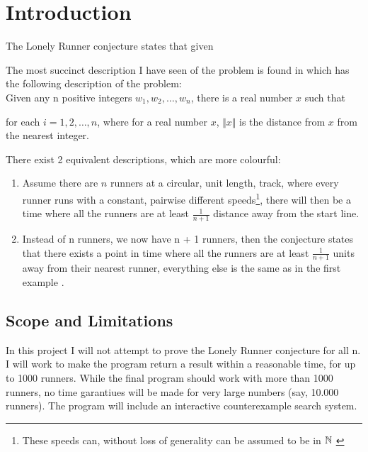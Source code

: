 \section{Introduction}
\label{introduction}

The Lonely Runner conjecture states that given 

The most succinct description I have seen of the problem is found in \cite{ANote} which has the following description of the problem:\\

Given any n positive integers $w_1, w_2, \ldots, w_n$, there is a real number $x$ such that 

for each $i = 1, 2, \ldots, n$, where for a real number $x$, $\Vert x \Vert$ is the distance from $x$ from the nearest integer.

There exist 2 equivalent descriptions, which are more colourful:
\begin{enumerate}
\item Assume there are $n$ runners at a circular, unit length, track, where every runner runs with a constant,  pairwise different speeds\footnote{These speeds can, without loss of generality can be assumed to be in $\mathbb{N}$ \cite{Bienia97flows.view-obstructions}}, there will then be a time where all the runners are at least $\frac{1}{n + 1}$ distance away from the start line.\\

\item Instead of n runners, we now have n + 1 runners, then the conjecture states that there exists a point in time where all the runners are at least $\frac{1}{n + 1}$ units away from their nearest runner, everything else is the same as in the first example \cite{Bienia97flows.view-obstructions}.\\
\end{enumerate}

\subsection{Scope and Limitations}
\label{scope}
In this project I will not attempt to prove the Lonely Runner conjecture for all n. 
I will work to make the program return a result within a reasonable time, for up to 1000 runners. While the final program should work with more than 1000 runners, no time garantiues will be made for very large numbers (say, 10.000 runners).
The program will include an interactive counterexample search system.

